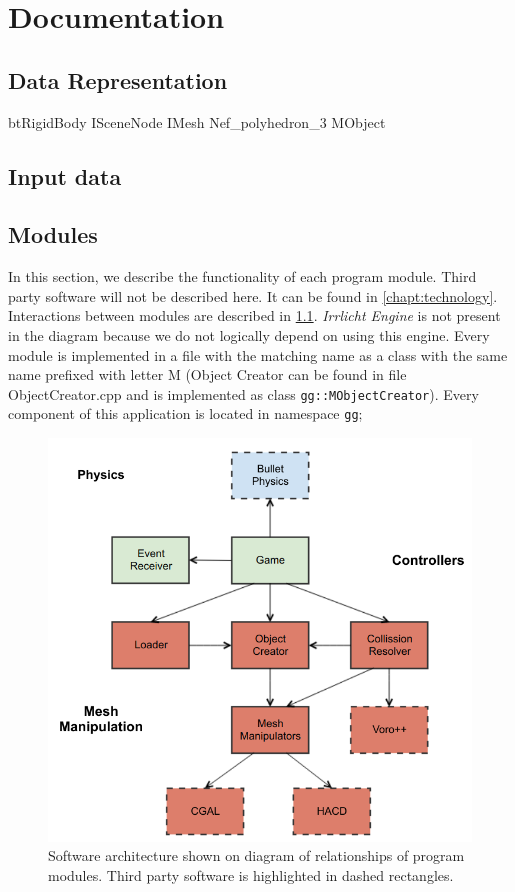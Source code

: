 \chapter{Documentation}

\section{Data Representation}
btRigidBody
ISceneNode
IMesh
Nef\_polyhedron\_3
MObject

\section{Input data}
\label{sec:data}

\section{Modules}
In this section, we describe the functionality of each program module. Third party software will not be described here. It can be found in \cref{chapt:technology}. Interactions between modules are described in \cref{fig:modules}. \emph{Irrlicht Engine} is not present in the diagram because we do not logically depend on using this engine. Every module is implemented in a file with the matching name as a class with the same name prefixed with letter M (Object Creator can be found in file ObjectCreator.cpp and is implemented as class {\tt gg::MObjectCreator}). Every component of this application is located in namespace {\tt gg};

\begin{figure}[ht!]
        \centering
        \includegraphics[width=\textwidth]{img/objectmodel}
        \caption{Software architecture shown on diagram of relationships of program modules. Third party software is highlighted in dashed rectangles.}
        \label{fig:modules}
\end{figure}

